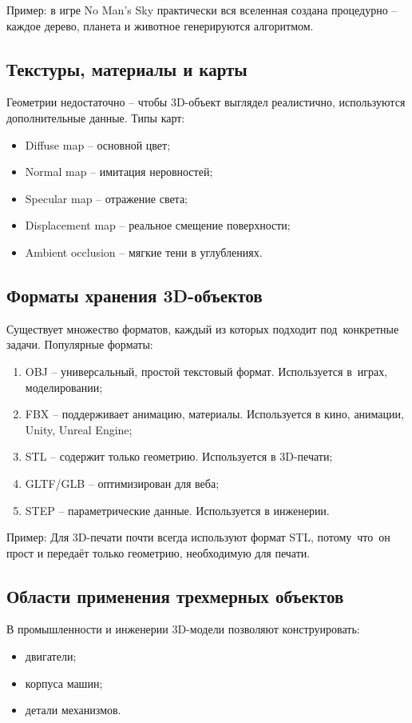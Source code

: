 \documentclass{ou}
\begin{document}
Пример: в игре No Man’s Sky практически вся вселенная создана процедурно -- каждое дерево, планета и животное генерируются алгоритмом.
\subsection{Текстуры, материалы и карты}
Геометрии недостаточно -- чтобы 3D-объект выглядел реалистично, используются дополнительные данные. Типы карт:
\begin{itemize}[label=-, leftmargin=0em, itemindent=3.35em, nosep]
\item Diffuse map -- основной цвет;
\item Normal map -- имитация неровностей;
\item Specular map -- отражение света;
\item Displacement map -- реальное смещение поверхности;
\item Ambient occlusion -- мягкие тени в углублениях.
\end{itemize}
\subsection{Форматы хранения 3D-объектов}
Существует множество форматов, каждый из которых подходит под~конкретные задачи. Популярные форматы:
\begin{enumerate}[leftmargin=0em, itemindent=3.75em, nosep, label=\arabic*)]
\item OBJ -- универсальный, простой текстовый формат. Используется в~играх, моделировании;
\item FBX -- поддерживает анимацию, материалы. Используется в кино, анимации, Unity, Unreal Engine;
\item STL -- содержит только геометрию. Используется в 3D-печати;
\item GLTF/GLB -- оптимизирован для веба;
\item STEP -- параметрические данные. Используется в инженерии.	
\end{enumerate}

Пример: Для 3D-печати почти всегда используют формат STL, потому~что~он прост и передаёт только геометрию, необходимую для печати.
\subsection{Области применения трехмерных объектов}
В промышленности и инженерии 3D-модели позволяют конструировать:
\begin{itemize}[label=-, leftmargin=0em, itemindent=3.35em, nosep]
\item двигатели;
\item корпуса машин;
\item детали механизмов.
\end{itemize}
\end{document}
